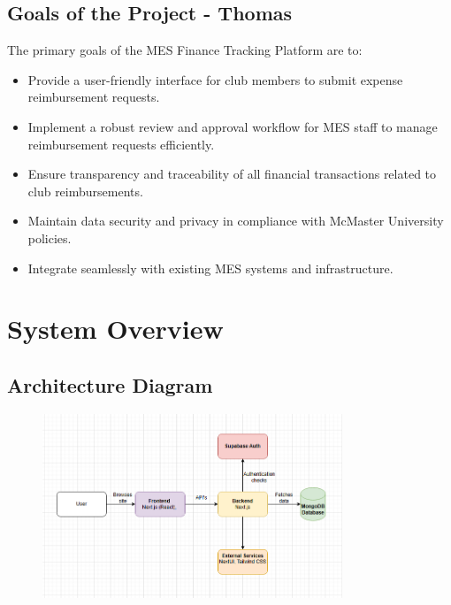 \documentclass[12pt]{article}
\begin{document}
  \subsection{Goals of the Project - Thomas}
    The primary goals of the MES Finance Tracking Platform are to:
    \begin{itemize}
      \item Provide a user-friendly interface for club members to submit expense reimbursement requests.
      \item Implement a robust review and approval workflow for MES staff to manage reimbursement requests efficiently.
      \item Ensure transparency and traceability of all financial transactions related to club reimbursements.
      \item Maintain data security and privacy in compliance with McMaster University policies.
      \item Integrate seamlessly with existing MES systems and infrastructure.
    \end{itemize}

\section{System Overview}

  \subsection{Architecture Diagram}
    \begin{figure}[H]
        \centering
        \includegraphics[width=0.8\textwidth]{architecture_diagram_Justin.png}
        \label{fig:architecture_diagram}
    \end{figure}
\end{document}

